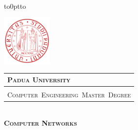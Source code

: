 \documentclass[a4paper, 8pt, twoside, openright]{book}
\begin{document}
\frontmatter

\begin{titlepage} %
\begin{center}
\vbox to0pt{\vbox to\vss}

\begin{center}
\begin{minipage}{.15\textwidth}
  \includegraphics[height=2.5cm]{./Images/Icon4}
\end{minipage}\begin{minipage}{.63\textwidth}
  \begin{table}[H]
  \begin{tabular}{l}
  \scshape{\Large{\bfseries{Padua University}}} \\
  \hline \\
  \scshape{\Large{Computer~Engineering~Master~Degree}} \\
  \end{tabular}
  \end{table}
\end{minipage}
\end{center}


\vspace{1cm}
\emph{\Large{}} \\
\vspace{0.9cm}
\scshape{\Large{\bfseries{Computer Networks}}} \\
\end{center}


\end{titlepage}
\end{document}
